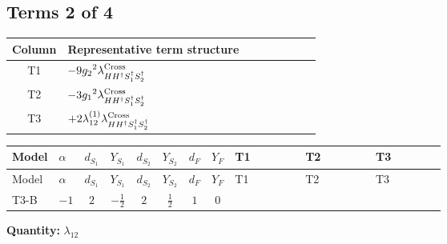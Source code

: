 \documentclass[8pt]{article}
\begin{document}
\begin{landscape}
\subsection*{Terms 2 of 4}
\begin{center}
\begin{tabular}{@{}c >{\raggedright\arraybackslash}p{0.82\linewidth}@{}}
\toprule
Column & Representative term structure \\
\midrule
T1 & \(\displaystyle -9 {g_2}^2 {\lambda_{H H^\dagger S_1^\dagger S_2^\dagger}^{\rm Cross}}\) \\
\midrule
T2 & \(\displaystyle -3 {g_1}^2 {\lambda_{H H^\dagger S_1^\dagger S_2^\dagger}^{\rm Cross}}\) \\
\midrule
T3 & \(\displaystyle +2 {\lambda_{12}^{(1)}} {\lambda_{H H^\dagger S_1^\dagger S_2^\dagger}^{\rm Cross}}\) \\
\midrule
\bottomrule
\end{tabular}
\end{center}
\smallskip
\tiny
\begin{longtable}{@{}llcccccc >{\raggedright\arraybackslash}p{0.21\linewidth} >{\raggedright\arraybackslash}p{0.21\linewidth} >{\raggedright\arraybackslash}p{0.21\linewidth}@{}}
\toprule
Model & $\alpha$ & $d_{S_1}$ & $Y_{S_1}$ & $d_{S_2}$ & $Y_{S_2}$ & $d_F$ & $Y_F$ & T1 & T2 & T3 \\
\midrule
\endfirsthead
\toprule
Model & $\alpha$ & $d_{S_1}$ & $Y_{S_1}$ & $d_{S_2}$ & $Y_{S_2}$ & $d_F$ & $Y_F$ & T1 & T2 & T3 \\
\midrule
\endhead
T3-B & $-1$ & $2$ & $-\frac{1}{2}$ & $2$ & $\frac{1}{2}$ & $1$ & $0$ & \scriptsize\adjustbox{max width=\linewidth}{$\begin{gathered} -9 {g_2}^2 {\lambda_{H H^\dagger S_1^\dagger S_2^\dagger}^{\rm Cross}}\end{gathered}$} & \scriptsize\adjustbox{max width=\linewidth}{$\begin{gathered} -3 {g_1}^2 {\lambda_{H H^\dagger S_1^\dagger S_2^\dagger}^{\rm Cross}}\end{gathered}$} & \scriptsize\adjustbox{max width=\linewidth}{$\begin{gathered} +2 {\lambda_{12}^{(1)}} {\lambda_{H H^\dagger S_1^\dagger S_2^\dagger}^{\rm Cross}}\end{gathered}$} \\
\midrule
\bottomrule
\end{longtable}
\clearpage
\noindent\textbf{Quantity: }$\lambda_{12}$\par\smallskip

\end{landscape}
\end{document}
